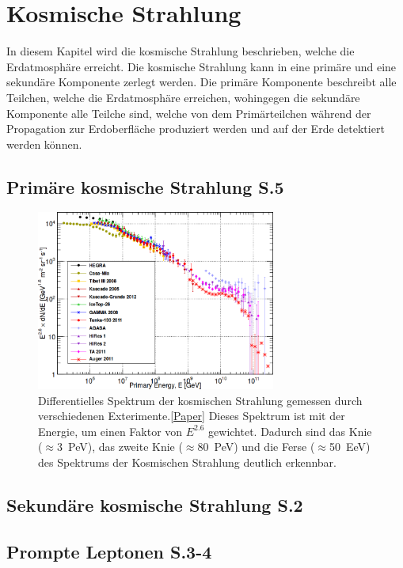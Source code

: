 \thispagestyle{plain}
\chapter{Kosmische Strahlung}
In diesem Kapitel wird die kosmische Strahlung beschrieben, welche die Erdatmosphäre erreicht. Die kosmische Strahlung kann in eine primäre und eine sekundäre Komponente zerlegt werden. Die primäre Komponente beschreibt alle Teilchen, welche die Erdatmosphäre erreichen, wohingegen die sekundäre Komponente alle Teilche sind, welche von dem Primärteilchen während der Propagation zur Erdoberfläche produziert werden und auf der Erde detektiert werden können.
 
\section{Primäre kosmische Strahlung S.5}
\begin{figure}[!h]
    \centering
    \includegraphics[width=0.7\textwidth]{./Plots/CR_Spectrum.png}
    \caption{Differentielles Spektrum der kosmischen Strahlung gemessen durch verschiedenen Exterimente.\ref{Paper} Dieses Spektrum ist mit der Energie, um einen Faktor von $E^{2.6}$ gewichtet. Dadurch sind das Knie ($\approx$\SI{3}{PeV}), das zweite Knie ($\approx$\SI{80}{PeV}) und die Ferse ($\approx$\SI{50}{EeV}) des Spektrums der Kosmischen Strahlung deutlich erkennbar.}
    \label{fig:SpecStrahl}
\end{figure}
\section{Sekundäre kosmische Strahlung S.2}
\section{Prompte Leptonen S.3-4}